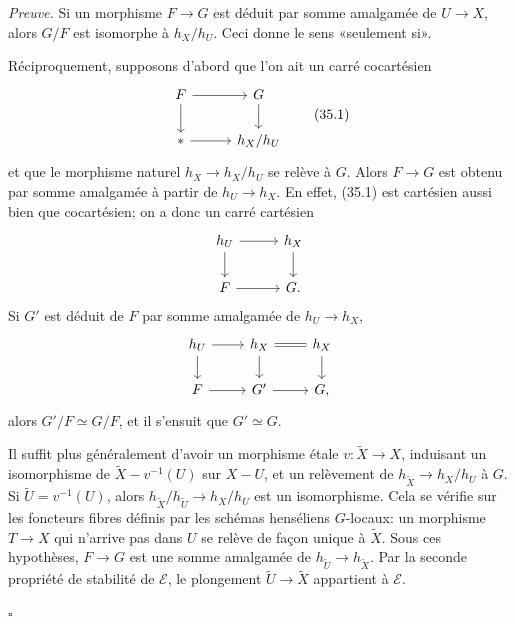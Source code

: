 \documentclass[11pt]{article}
\newcommand{\pt}{*}
\theoremstyle{deligne}
\newenvironment{proofdel}{\noindent\textit{Preuve.}}{\hfill$\square$}
\begin{document}
\begin{proofdel}
Si un morphisme \(F\to G\) est déduit par somme amalgamée de \(U\to X\), alors \(G/F\) est isomorphe à \(h_X/h_U\). Ceci donne le sens «seulement si».

Réciproquement, supposons d'abord que l'on ait un carré cocartésien
\[
\begin{tikzcd}[column sep=2.8em,row sep=1.8em]
F \arrow[r] \arrow[d] & G \arrow[d]\\
\pt \arrow[r] & h_X/h_U
\end{tikzcd}
\tag{35.1}
\]
et que le morphisme naturel \(h_X\to h_X/h_U\) se relève à \(G\). Alors \(F\to G\) est obtenu par somme amalgamée à partir de \(h_U\to h_X\). En effet, (35.1) est cartésien aussi bien que cocartésien; on a donc un carré cartésien
\[
\begin{tikzcd}[column sep=2.8em,row sep=1.8em]
h_U \arrow[r] \arrow[d] & h_X \arrow[d]\\
F \arrow[r] & G .
\end{tikzcd}
\]
Si \(G'\) est déduit de \(F\) par somme amalgamée de \(h_U\to h_X\),
\[
\begin{tikzcd}[column sep=2.3em,row sep=1.6em]
h_U \arrow[r] \arrow[d] & h_X \arrow[d] \arrow[r,equal] & h_X \arrow[d]\\
F \arrow[r] & G' \arrow[r] & G ,
\end{tikzcd}
\]
alors \(G'/F\simeq G/F\), et il s'ensuit que \(G'\simeq G\).

Il suffit plus généralement d'avoir un morphisme étale \(v:\widetilde X\to X\), induisant un isomorphisme de \(\widetilde X-v^{-1}(U)\) sur \(X-U\), et un relèvement de \(h_{\widetilde X}\to h_X/h_U\) à \(G\). Si \(\widetilde U=v^{-1}(U)\), alors \(h_{\widetilde X}/h_{\widetilde U}\to h_X/h_U\) est un isomorphisme. Cela se vérifie sur les foncteurs fibres définis par les schémas henséliens \(G\)-locaux: un morphisme \(T\to X\) qui n'arrive pas dans \(U\) se relève de façon unique à \(\widetilde X\). Sous ces hypothèses, \(F\to G\) est une somme amalgamée de \(h_{\widetilde U}\to h_{\widetilde X}\). Par la seconde propriété de stabilité de \(\mathcal E\), le plongement \(\widetilde U\to\widetilde X\) appartient à \(\mathcal E\).


\end{proofdel}
\end{document}
